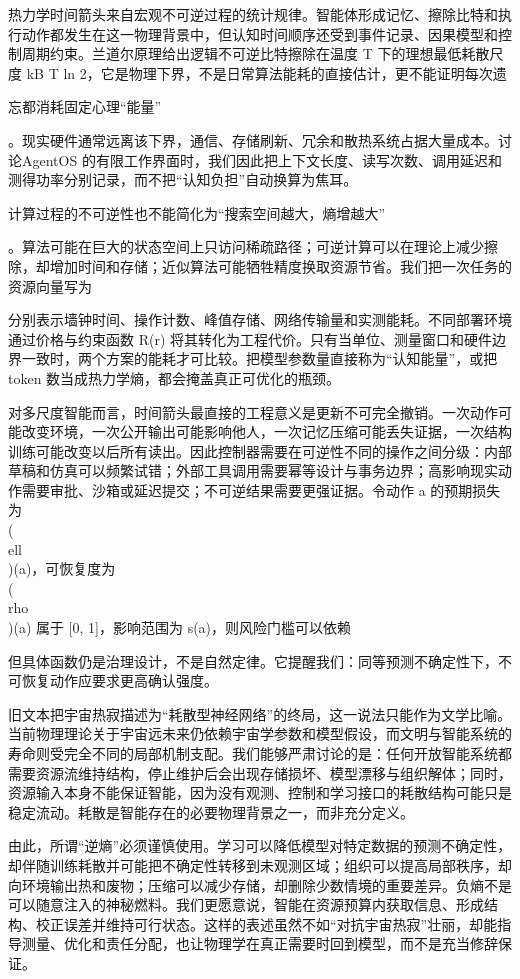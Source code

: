 热力学时间箭头来自宏观不可逆过程的统计规律。智能体形成记忆、擦除比特和执行动作都发生在这一物理背景中，但认知时间顺序还受到事件记录、因果模型和控制周期约束。兰道尔原理给出逻辑不可逆比特擦除在温度 T 下的理想最低耗散尺度 kB T ln 2，它是物理下界，不是日常算法能耗的直接估计，更不能证明每次遗

忘都消耗固定心理“能量”

。现实硬件通常远离该下界，通信、存储刷新、冗余和散热系统占据大量成本。讨论AgentOS 的有限工作界面时，我们因此把上下文长度、读写次数、调用延迟和测得功率分别记录，而不把“认知负担”自动换算为焦耳。

计算过程的不可逆性也不能简化为“搜索空间越大，熵增越大”

。算法可能在巨大的状态空间上只访问稀疏路径；可逆计算可以在理论上减少擦除，却增加时间和存储；近似算法可能牺牲精度换取资源节省。我们把一次任务的资源向量写为

分别表示墙钟时间、操作计数、峰值存储、网络传输量和实测能耗。不同部署环境通过价格与约束函数 R(r) 将其转化为工程代价。只有当单位、测量窗口和硬件边界一致时，两个方案的能耗才可比较。把模型参数量直接称为“认知能量”，或把 token 数当成热力学熵，都会掩盖真正可优化的瓶颈。

对多尺度智能而言，时间箭头最直接的工程意义是更新不可完全撤销。一次动作可能改变环境，一次公开输出可能影响他人，一次记忆压缩可能丢失证据，一次结构训练可能改变以后所有读出。因此控制器需要在可逆性不同的操作之间分级：内部草稿和仿真可以频繁试错；外部工具调用需要幂等设计与事务边界；高影响现实动作需要审批、沙箱或延迟提交；不可逆结果需要更强证据。令动作 a 的预期损失为 \\(\\ell\\)(a)，可恢复度为 \\(\\rho\\)(a) 属于 [0, 1]，影响范围为 s(a)，则风险门槛可以依赖

但具体函数仍是治理设计，不是自然定律。它提醒我们：同等预测不确定性下，不可恢复动作应要求更高确认强度。

旧文本把宇宙热寂描述为“耗散型神经网络”的终局，这一说法只能作为文学比喻。当前物理理论关于宇宙远未来仍依赖宇宙学参数和模型假设，而文明与智能系统的寿命则受完全不同的局部机制支配。我们能够严肃讨论的是：任何开放智能系统都需要资源流维持结构，停止维护后会出现存储损坏、模型漂移与组织解体；同时，资源输入本身不能保证智能，因为没有观测、控制和学习接口的耗散结构可能只是稳定流动。耗散是智能存在的必要物理背景之一，而非充分定义。

由此，所谓“逆熵”必须谨慎使用。学习可以降低模型对特定数据的预测不确定性，却伴随训练耗散并可能把不确定性转移到未观测区域；组织可以提高局部秩序，却向环境输出热和废物；压缩可以减少存储，却删除少数情境的重要差异。负熵不是可以随意注入的神秘燃料。我们更愿意说，智能在资源预算内获取信息、形成结构、校正误差并维持可行状态。这样的表述虽然不如“对抗宇宙热寂”壮丽，却能指导测量、优化和责任分配，也让物理学在真正需要时回到模型，而不是充当修辞保证。

